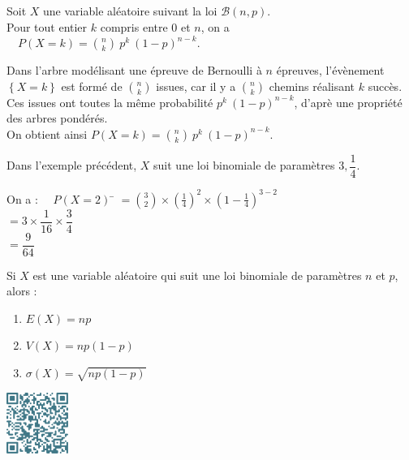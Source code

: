 \documentclass[a4paper,11pt,cours]{nsi} %
\begin{document}
\begin{propriete}[]
    Soit $X$ une variable aléatoire suivant la loi $\mathcal{B}(n,p)$.\\
    Pour tout entier $k$ compris entre $0$ et $n$, on a $\quad P(X=k)=\displaystyle\binom{n}{k}\ p^k\ (1-p)^{n-k}$.
\end{propriete}

\begin{demonstration}
    Dans l'arbre modélisant une épreuve de Bernoulli à $n$ épreuves, l'évènement $\left\{X=k\right\}$ est formé de $\displaystyle\binom{n}{k}$ issues, car il y a $\displaystyle\binom{n}{k}$ chemins réalisant $k$ succès.\\
    Ces issues ont toutes la même probabilité $p^k\ (1-p)^{n-k}$, d'aprè une propriété des arbres pondérés.\\
    On obtient ainsi $P(X=k)=\displaystyle\binom{n}{k}\ p^k\ (1-p)^{n-k}$.
\end{demonstration}

\begin{exemple}[]
    Dans l'exemple précédent, $X$ suit une loi binomiale de paramètres $3, \dfrac{1}{4}$. 
    \begin{tabbing}
        On a : $\quad P(X=2)$    \=  $=\displaystyle\binom{3}{2}\times \left(\frac{1}{4}\right)^2\times \left(1-\frac{1}{4}\right)^{3-2}$\\[.5em]
        \>  $=3\times \dfrac{1}{16} \times \dfrac{3}{4}$\\[.5em]
        \>  $=\dfrac{9}{64}$
    \end{tabbing}   
\end{exemple}

\begin{propriete}[ (admise)]
    Si $X$ est une variable aléatoire qui suit une loi binomiale de paramètres $n$ et $p$, alors :
    \setlength{\columnseprule}{0pt}
    \begin{multicols}{3}
        \begin{enumerate}[label=\textbullet]
            \item $E(X)=np$
            \item $V(X)=np(1-p)$
            \item $\sigma(X)=\sqrt{np(1-p)}$
        \end{enumerate}
    \end{multicols}
\end{propriete}

\vspace*{.5cm}
\dleft{14cm}{
    \textcolor{UGLiBlue}{Tutoriel vidéo pour calculer des probabilités dans le cadre d'une loi binomiale à l'aide de la calculatrice :}\\
}
{\includegraphics[width=2cm]{code-qr1.png}}
\end{document}
